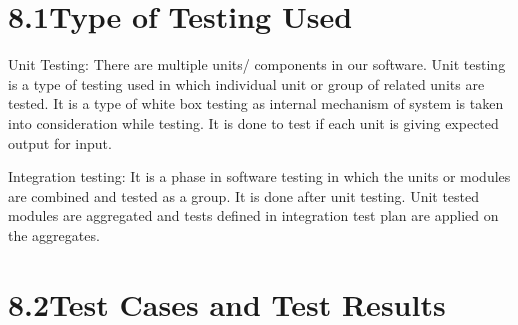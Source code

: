 \documentclass[oneside,a4paper,12pt]{book}
\begin{document}
\section*{8.1\hspace*{10pt}Type of Testing Used}

\vspace{\baselineskip}
\setlength{\parskip}{0.0pt}
	\item Unit Testing: There are multiple units/ components in our software. Unit testing is a type of testing used in which individual unit or group of related units are tested. It is a type of white box testing as internal mechanism of system is taken into consideration while testing. It is done to test if each unit is giving expected output for input. \par

\setlength{\parskip}{9.96pt}
	\item Integration testing: It is a phase in software testing in which the units or modules are combined and tested as a group. It is done after unit testing. Unit tested modules are aggregated and tests deﬁned in integration test plan are applied on the aggregates.\par
	
\section*{8.2\hspace*{10pt}Test Cases and Test Results}

\vspace{\baselineskip}


\end{document}
